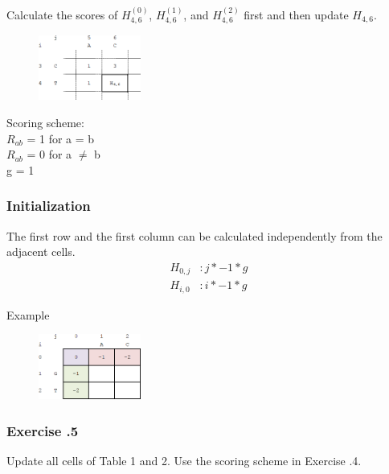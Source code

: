Calculate the scores of $H_{4,6}^{(0)}$, $H_{4,6}^{(1)}$, and $H_{4,6}^{(2)}$ first and then update $H_{4,6}$.
\begin{multicols}{2}
\begin{figure}[H]
  \centering
      \includegraphics[width=0.3\textwidth]{fig02/dynamic_programmoing_cell_update_exercise.png}
\end{figure}

\noindent Scoring scheme: \\ 
$R_{ab}$ = 1 for a = b \\ 
$R_{ab}$ = 0 for a $\neq$ b \\ 
g = 1

\end{multicols} 

%
%
\subsubsection*{Initialization}

The first row and the first column can be calculated independently from the adjacent cells.
\begin{align*}
H_{0,j} &:  j * -1 * g \\
H_{i,0} &: i * -1 * g
\end{align*}

\noindent
Example
\begin{figure}[H]
  \centering
      \includegraphics[width=0.3\textwidth]{fig02/dynamic_programmoing_initialization.png}
\end{figure}

%
%
\subsubsection*{Exercise \thesection.5}
Update all cells of Table 1 and 2. Use the scoring scheme in Exercise \thesection.4.

